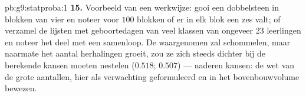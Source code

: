 \begin{solution}{pb:g9:statproba:1}
\textbf{15.} Voorbeeld van een werkwijze: gooi een dobbelsteen in blokken van vier
en noteer voor $100$ blokken of er in elk blok een zes valt; of verzamel de lijsten
met geboortedagen van veel klassen van ongeveer $23$ leerlingen en noteer het deel
met een samenloop. De waargenomen  zal schommelen, maar naarmate het
aantal herhalingen groeit, zou ze zich steeds dichter bij de berekende kansen moeten
nestelen ($0.518$; $0.507$) ---  naderen kansen: de wet van de grote
aantallen, hier als verwachting geformuleerd en in het bovenbouwvolume bewezen.
\end{solution}
